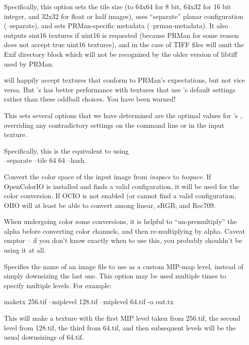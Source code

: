 Specifically, this option sets the tile size (to 64x64 for 8 bit,
64x32 for 16 bit integer, and 32x32 for float or {\cf half} images),
uses ``separate'' planar configuration ({\cf --separate}), and sets
PRMan-specific metadata ({\cf --prman-metadata}).  It also outputs 
sint16 textures if uint16 is requested (because PRMan for some reason
does not accept true uint16 textures), and in the case of TIFF files will
omit the Exif directory block which will not be recognized by the older
version of libtiff used by PRMan.

\OpenImageIO will happily accept textures that conform to PRMan's
expectations, but not vice versa.  But \OpenImageIO's \TextureSystem
has better performance with textures that use \maketx's default settings
rather than these oddball choices.  You have been warned!
\apiend

This sets several options that we have determined are the 
optimal values for \OpenImageIO's \TextureSystem, overriding any
contradictory settings on the command line or in the input texture.

Specifically, this is the equivalent to using \\
 {\cf --separate --tile 64 64 --hash}.
\apiend

Convert the color space of the input image from \emph{inspace} to
\emph{tospace}.  If OpenColorIO is installed and finds a valid
configuration, it will be used for the color conversion.  If OCIO
is not enabled (or cannot find a valid configuration, OIIO will at
least be able to convert among linear, sRGB, and Rec709.
\apiend

When undergoing color some conversions, it is helpful to
``un-premultiply'' the alpha before converting color channels, and then
re-multiplying by alpha.  Caveat emptor -- if you don't know exactly
when to use this, you probably shouldn't be using it at all.
\apiend


Specifies the name of an image file to use as a custom MIP-map level, 
instead of simply downsizing the last one.  This option may be used
multiple times to specify multiple levels.  For example:
\begin{code}
    maketx 256.tif --miplevel 128.tif --miplevel 64.tif -o out.tx
\end{code}
This will make a texture with the first MIP level taken from {\cf 256.tif},
the second level from {\cf 128.tif}, the third from {\cf 64.tif}, and
then subsequent levels will be the usual downsizings of {\cf 64.tif}.
\apiend

